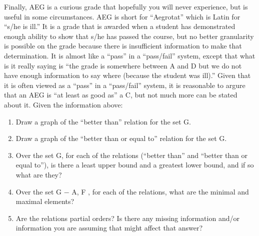 \documentclass[12pt]{article}
\newenvironment{solution}[2][Solution]{ \begin{trivlist}
\item[\hskip \labelsep {\bfseries #1}]}{\end{trivlist}}
\newenvironment{problem}[2][Problem]{\begin{trivlist}
\item[\hskip \labelsep {\bfseries #1}\hskip \labelsep {\bfseries #2.}]}{\end{trivlist}}
\begin{document}
\begin{problem}{7}
Finally, AEG is a curious grade that hopefully you will never experience, but is useful in some circumstances. AEG is short for “Aegrotat” which is Latin for “s/he is ill.” It is a grade that is awarded when a student has demonstrated enough ability to show that s/he has passed the course, but no better granularity is possible on the grade because there is insufficient information to make that determination. It is almost like a “pass” in a “pass/fail” system, except that what is it really saying is “the grade is somewhere between A and D but we do not have enough information to say where (because the student was ill).” Given that it is often viewed as a “pass” in a “pass/fail” system, it is reasonable to argure that an AEG is “at least as good as” a C, but not much more can be stated about it.
Given the information above:
\item[]
\begin{enumerate}[label=\alph*)]
    \item Draw a graph of the “better than” relation for the set G.
    \item Draw a graph of the “better than or equal to” relation for the set G.
    \item Over the set G, for each of the relations (“better than” and “better than or equal to”), is there a least upper bound and a greatest lower bound, and if so what are they?
    \item Over the set G − {A, F }, for each of the relations, what are the minimal and maximal elements?
    \item Are the relations partial orders? Is there any missing information and/or information you are assuming that might affect that answer?
\end{enumerate}
\end{problem}
\begin{solution}{7}
\item[]
\begin{enumerate}[label=\alph*)]
\end{enumerate}
\end{solution}
\pagebreak
\end{document}

